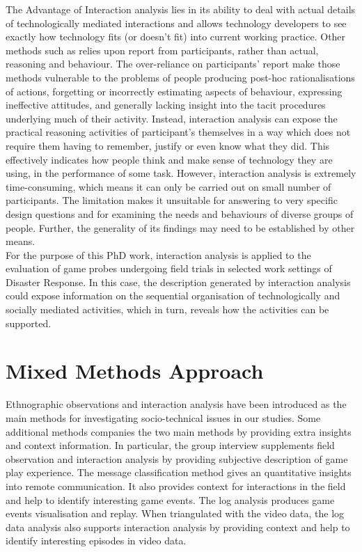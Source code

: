 The Advantage of Interaction analysis lies in its ability to deal with actual details of technologically mediated interactions and allows technology developers to see exactly how technology fits (or doesn't fit) into current working practice. Other methods such as relies upon report from participants, rather than actual, reasoning and behaviour. The over-reliance on participants' report make those methods vulnerable to the problems of people producing post-hoc rationalisations of actions, forgetting or incorrectly estimating aspects of behaviour, expressing ineffective attitudes, and generally lacking insight into the tacit procedures underlying much of their activity. Instead, interaction analysis can expose the practical reasoning activities of participant's themselves in a way which does not require them having to remember, justify or even know what they did. This effectively indicates how people think and make sense of technology they are using, in the performance of some task. However, interaction analysis is extremely time-consuming, which means it can only be carried out on small number of participants. The limitation makes it unsuitable for answering to very specific design questions and for examining the needs and behaviours of diverse groups of people. Further, the generality of its findings may need to be established by other means.\\

For the purpose of this PhD work, interaction analysis is applied to the evaluation of game probes undergoing field trials in selected work settings of Disaster Response. In this case, the description generated by interaction analysis could expose information on the sequential organisation of technologically and socially mediated activities, which in turn, reveals how the activities can be supported.\\

\section{Mixed Methods Approach}
Ethnographic observations and interaction analysis have been introduced as the main methods for investigating socio-technical issues in our studies. Some additional methods companies the two main methods by providing extra insights and context information. In particular, the group interview supplements field observation and interaction analysis by providing subjective description of game play experience. The message classification method gives an quantitative insights into remote communication. It also provides context for interactions in the field and help to identify interesting game events. The log analysis produces game events visualisation and replay. When triangulated with the video data, the log data analysis also supports interaction analysis by providing context and help to identify interesting episodes in video data.


